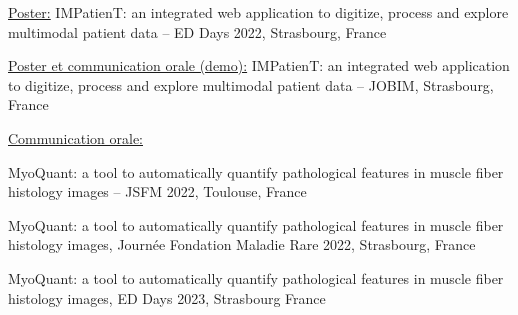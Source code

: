 \underline{Poster:} IMPatienT: an integrated web application to digitize, process and explore multimodal patient data – ED Days 2022, Strasbourg, France

\underline{Poster et communication orale (demo):} IMPatienT: an integrated web application to digitize, process and explore multimodal patient data – JOBIM, Strasbourg, France

\underline{Communication orale:}

MyoQuant: a tool to automatically quantify pathological features in muscle fiber histology images – JSFM 2022, Toulouse, France

MyoQuant: a tool to automatically quantify pathological features in muscle fiber histology images, Journée Fondation Maladie Rare 2022, Strasbourg, France

MyoQuant: a tool to automatically quantify pathological features in muscle fiber histology images, ED Days 2023, Strasbourg France

